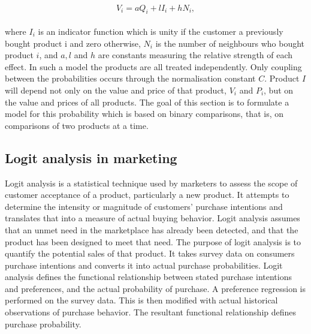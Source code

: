 \\
\begin{equation} \label{eq:11}
V_i = aQ_i + lI_i + hN_i,
\end{equation}
\\
where $I_i$ is an indicator function which is unity if the customer a previously bought product i and zero otherwise,
$N_i$ is the number of neighbours who bought product $i$, and $a, l$ and $h$ are constants measuring the relative strength
of each effect.
In such a model the products are all treated independently.
Only coupling between the probabilities occurs through the normalisation constant $C$.
Product $I$ will depend not only on the value and price of that product, $V_i$ and $P_i$, but on the value and prices of all products.
The goal of this section is to formulate a model for this probability which is based on binary comparisons, that is,
on comparisons of two products at a time.\\
\subsection{Logit analysis in marketing} \label{subsec:logit}
Logit analysis is a statistical technique used by marketers to assess the scope of customer acceptance of a product, particularly a new product.
It attempts to determine the intensity or magnitude of customers' purchase intentions and translates that into a measure of actual buying behavior.
Logit analysis assumes that an unmet need in the marketplace has already been detected, and that the product has been designed to meet that need.
The purpose of logit analysis is to quantify the potential sales of that product.
It takes survey data on consumers purchase intentions and converts it into actual purchase probabilities.
Logit analysis defines the functional relationship between stated purchase intentions and preferences, and the actual probability of purchase.
A preference regression is performed on the survey data.
This is then modified with actual historical observations of purchase behavior.
The resultant functional relationship defines purchase probability.

